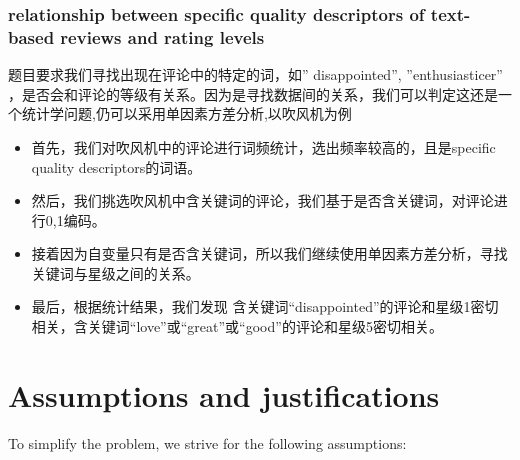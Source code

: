 \documentclass{mcmthesis}
\begin{document}
\subsubsection{relationship between specific quality descriptors of text-based reviews and rating levels}
题目要求我们寻找出现在评论中的特定的词，如” disappointed”, ”enthusiasticer” ，是否会和评论的等级有关系。因为是寻找数据间的关系，我们可以判定这还是一个统计学问题,仍可以采用单因素方差分析,以吹风机为例
\begin{itemize}
	\item 首先，我们对吹风机中的评论进行词频统计，选出频率较高的，且是specific quality descriptors的词语。
	\item 然后，我们挑选吹风机中含关键词的评论，我们基于是否含关键词，对评论进行0,1编码。
	\item 接着因为自变量只有是否含关键词，所以我们继续使用单因素方差分析，寻找关键词与星级之间的关系。
	\item 最后，根据统计结果，我们发现
	含关键词“disappointed”的评论和星级1密切相关，含关键词“love”或“great”或“good”的评论和星级5密切相关。
\end{itemize}
\section{Assumptions and justifications}

To simplify the problem, we strive for the following assumptions:
\end{document}
